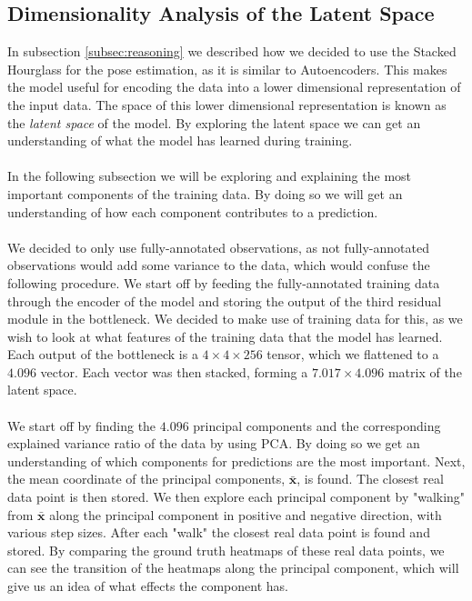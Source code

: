 \documentclass[./main.tex]{subfiles}
\begin{document}
\subsection{Dimensionality Analysis of the Latent Space}\label{subsec:shape_analysis}
In subsection \ref{subsec:reasoning} we described how we decided to use the Stacked Hourglass for the pose estimation, as it is similar to Autoencoders. This makes the model useful for encoding the data into a lower dimensional representation of the input data. The space of this lower dimensional representation is known as the \textit{latent space} of the model. By exploring the latent space we can get an understanding of what the model has learned during training.
\\
\\
In the following subsection we will be exploring and explaining the most important components of the training data. By doing so we will get an understanding of how each component contributes to a prediction.
\\
\\
We decided to only use fully-annotated observations, as not fully-annotated observations would add some variance to the data, which would confuse the following procedure. We start off by feeding the fully-annotated training data through the encoder of the model and storing the output of the third residual module in the bottleneck. We decided to make use of training data for this, as we wish to look at what features of the training data that the model has learned. Each output of the bottleneck is a $4 \times 4 \times 256$ tensor, which we flattened to a $4.096$ vector. Each vector was then stacked, forming a $7.017 \times 4.096$ matrix of the latent space.
\\
\\
We start off by finding the $4.096$ principal components and the corresponding explained variance ratio of the data by using PCA. By doing so we get an understanding of which components for predictions are the most important. Next, the mean coordinate of the principal components, $\bar{\bm{x}}$, is found. The closest real data point is then stored. We then explore each principal component by "walking" from $\bar{\bm{x}}$ along the principal component in positive and negative direction, with various step sizes. After each "walk" the closest real data point is found and stored. By comparing the ground truth heatmaps of these real data points, we can see the transition of the heatmaps along the principal component, which will give us an idea of what effects the component has.
\end{document}
